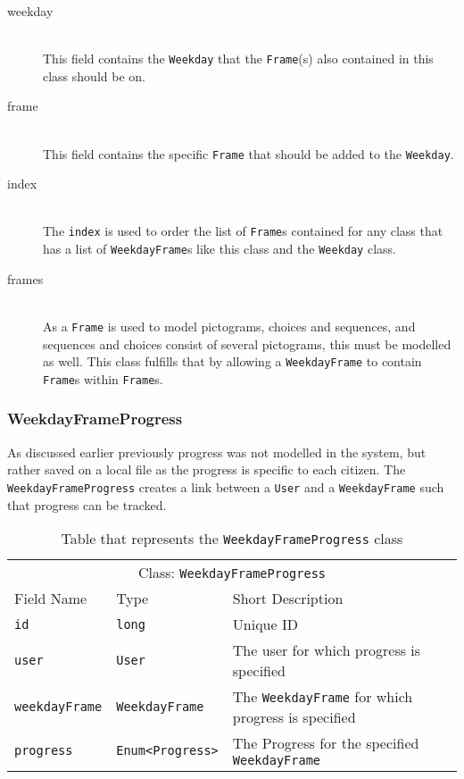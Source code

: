 \noindent
\begin{description}
    \item [weekday] \hfill \\
    This field contains the \texttt{Weekday} that the \texttt{Frame}(s) also contained in this class should be on.
    \item [frame] \hfill \\
    This field contains the specific \texttt{Frame} that should be added to the \texttt{Weekday}.
    \item [index] \hfill \\
    The \texttt{index} is used to order the list of \texttt{Frame}s contained for any class that has a list of \texttt{WeekdayFrame}s like this class and the \texttt{Weekday} class.
    \item [frames] \hfill \\
    As a \texttt{Frame} is used to model pictograms, choices and sequences, and sequences and choices consist of several pictograms, this must be modelled as well.
    This class fulfills that by allowing a \texttt{WeekdayFrame} to contain \texttt{Frame}s within \texttt{Frame}s.

\end{description}

\subsubsection{WeekdayFrameProgress}
As discussed earlier previously progress was not modelled in the system, but rather saved on a local file as the progress is specific to each citizen.
The \texttt{WeekdayFrameProgress} creates a link between a \texttt{User} and a \texttt{WeekdayFrame} such that progress can be tracked.

\begin{table}[]
\centering
\caption{Table that represents the \texttt{WeekdayFrameProgress} class}
\label{tbl:WeekdayFrameProgress}
\begin{tabular}{lll}
\multicolumn{3}{c}{Class: \texttt{WeekdayFrameProgress}}                                                                        \\
Field Name            & Type                                        & Short Description                                         \\
\texttt{id}           & \texttt{long}                               & Unique ID                                                 \\
\texttt{user}         & \texttt{User}                               & The user for which progress is specified                  \\
\texttt{weekdayFrame} & \texttt{WeekdayFrame}                       & The \texttt{WeekdayFrame} for which progress is specified \\
\texttt{progress}     & \texttt{Enum\textless Progress\textgreater} & The Progress for the specified \texttt{WeekdayFrame}     
\end{tabular}
\end{table}

